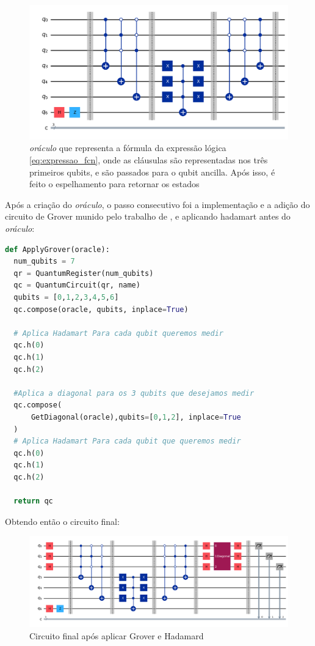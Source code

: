 \documentclass[12pt]{article}
\begin{document}
\begin{figure}[h]
\centering
\includegraphics[width=1\textwidth]{Oraculo.png}
\caption{\textit{oráculo} que representa a fórmula da expressão lógica \ref{eq:expressao_fcn}, onde as cláusulas são representadas nos três primeiros qubits, e são passados para o qubit ancilla. Após isso, é feito o espelhamento para retornar os estados }
\label{fig:oracle}
\end{figure}

Após a criação do \textit{oráculo}, o passo consecutivo foi a implementação e a adição do circuito de Grover munido pelo trabalho de \textbf{\cite{gamberi:22}}, e aplicando hadamart antes do \textit{oráculo}:

\begin{lstlisting}[language=Python, caption={Adição do operador de Grover ao \textit{oráculo}}, label={lst:grover_e_oraculo}, frame=single]
def ApplyGrover(oracle):
  num_qubits = 7
  qr = QuantumRegister(num_qubits)
  qc = QuantumCircuit(qr, name)
  qubits = [0,1,2,3,4,5,6]
  qc.compose(oracle, qubits, inplace=True)

  # Aplica Hadamart Para cada qubit queremos medir
  qc.h(0)
  qc.h(1)
  qc.h(2)

  #Aplica a diagonal para os 3 qubits que desejamos medir
  qc.compose(
      GetDiagonal(oracle),qubits=[0,1,2], inplace=True
  )
  # Aplica Hadamart Para cada qubit que queremos medir
  qc.h(0)
  qc.h(1)
  qc.h(2)

  return qc
\end{lstlisting}

Obtendo então o circuito final:
\begin{figure}[h]
\centering
\includegraphics[width=1\textwidth]{circuito_final.png}
\caption{Circuito final após aplicar Grover e Hadamard}
\label{fig:circuito_final}
\end{figure}
\end{document}
